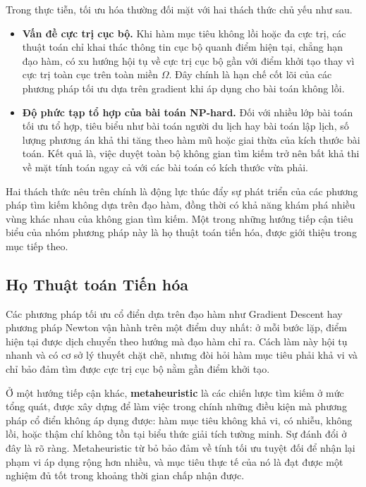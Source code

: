 Trong thực tiễn, tối ưu hóa thường đối mặt với hai thách thức chủ yếu
như sau.

\begin{itemize}
    \item \textbf{Vấn đề cực trị cục bộ.} Khi hàm mục tiêu không lồi hoặc
    đa cực trị, các thuật toán chỉ khai thác thông tin cục bộ quanh điểm
    hiện tại, chẳng hạn đạo hàm, có xu hướng hội tụ về cực trị cục bộ gần
    với điểm khởi tạo thay vì cực trị toàn cục trên toàn miền $\Omega$.
    Đây chính là hạn chế cốt lõi của các phương pháp tối ưu dựa trên
    gradient khi áp dụng cho bài toán không lồi.
    \item \textbf{Độ phức tạp tổ hợp của bài toán NP-hard.} Đối với
    nhiều lớp bài toán tối ưu tổ hợp, tiêu biểu như bài toán người du
    lịch hay bài toán lập lịch, số
    lượng phương án khả thi tăng theo hàm mũ hoặc giai thừa của kích
    thước bài toán. Kết quả là, việc duyệt toàn bộ không gian tìm kiếm
    trở nên bất khả thi về mặt tính toán ngay cả với các bài toán có
    kích thước vừa phải.
\end{itemize}

Hai thách thức nêu trên chính là động lực thúc đẩy sự phát triển của
các phương pháp tìm kiếm không dựa trên đạo hàm, đồng thời có khả năng
khám phá nhiều vùng khác nhau của không gian tìm kiếm. Một trong những
hướng tiếp cận tiêu biểu của nhóm phương pháp này là họ thuật toán tiến
hóa, được giới thiệu trong mục tiếp theo.

\subsection*{Họ Thuật toán Tiến hóa}
\label{subsec:ho-thuat-toan-tien-hoa}

Các phương pháp tối ưu cổ điển dựa trên đạo hàm như Gradient Descent hay
phương pháp Newton vận hành trên một điểm duy nhất: ở mỗi bước lặp, điểm
hiện tại được dịch chuyển theo hướng mà đạo hàm chỉ ra. Cách làm này hội
tụ nhanh và có cơ sở lý thuyết chặt chẽ, nhưng đòi hỏi hàm mục tiêu phải
khả vi và chỉ bảo đảm tìm được cực trị cục bộ nằm gần điểm khởi tạo.

Ở một hướng tiếp cận khác, \textbf{metaheuristic} là các chiến lược tìm
kiếm ở mức tổng quát, được xây dựng để làm việc trong chính những điều
kiện mà phương pháp cổ điển không áp dụng được: hàm mục tiêu không khả
vi, có nhiễu, không lồi, hoặc thậm chí không tồn tại biểu thức giải tích
tường minh. Sự đánh đổi ở đây là rõ ràng. Metaheuristic từ bỏ bảo đảm
về tính tối ưu tuyệt đối để nhận lại phạm vi áp dụng rộng hơn nhiều, và
mục tiêu thực tế của nó là đạt được một nghiệm đủ tốt trong khoảng thời
gian chấp nhận được.

